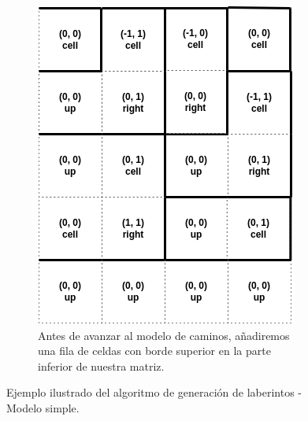 \begin{figure}[H]
\begin{subfigure}[b]{0.95\textwidth}
        \end{subfigure}
        \par\bigskip
        \begin{subfigure}[b]{0.95\textwidth}
            \centering
            \includegraphics[scale=0.45]{img/paso9.png}
            \caption{Antes de avanzar al modelo de caminos, añadiremos una fila de celdas con borde superior en la parte inferior de nuestra matriz.}
        \end{subfigure}
        \caption{Ejemplo ilustrado del algoritmo de generación de laberintos - Modelo simple.}
        \label{fig:simple3}
    \end{figure}

